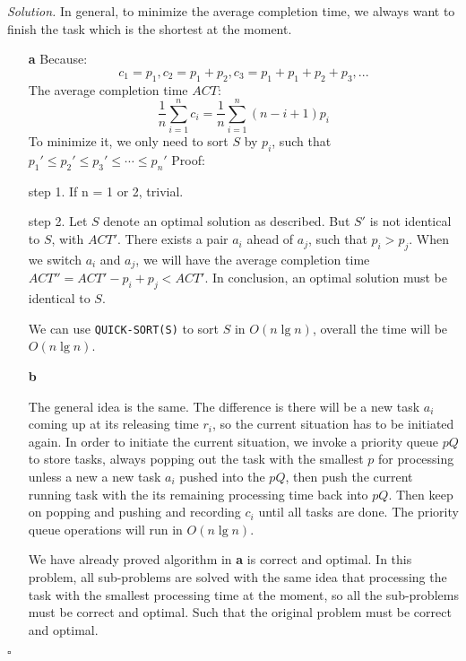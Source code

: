\documentclass[11pt]{article}
\theoremstyle{definition}
\newenvironment{solution}{\noindent\emph{Solution.}}{\hfill$\square$}
\newcommand\tab[1][1cm]{\hspace*{#1}}
\begin{document}
\begin{solution}
In general, to minimize the average completion time, we always want to finish the task which is the shortest at the moment.

\begin{enumerate}
  \item[\textbf{a}]
 Because: $$c_1 = p_1, c_2= p_1 + p_2, c_3 = p_1 + p_1 + p_2 + p_3,...$$
 The average completion time $ACT$:  $$\frac{1}{n}\sum_{i=1}^n c_i = \frac{1}{n}\sum_{i=1}^n (n-i+1)p_i$$
 To minimize it, we only need to sort $S$ by $p_i$, such that $p_1' \leq p_2' \leq p_3' \leq \cdots \leq p_n'$
Proof: 

\tab step 1. If n = 1 or 2, trivial.

\tab step 2. Let $S$ denote an optimal solution as described. But $S'$ is not identical to $S$, with $ACT'$. There exists a pair $a_i$ ahead of $a_j$, such that $p_i > p_j$. When we switch $a_i$ and $a_j$, we will have the average completion time $ACT'' = ACT' - p_i + p_j < ACT'$.
\tab In conclusion, an optimal solution must be identical to $S$.

We can use \texttt{QUICK-SORT(S)} to sort $S$ in $O(n \lg n)$, overall the time will be $O(n \lg n)$.

  \item[\textbf{b}]
  
  The general idea is the same. The difference is there will be a new task $a_i$ coming up at its releasing time $r_i$, so the current situation has to be initiated again. In order to initiate the current situation, we invoke a priority queue $pQ$ to store tasks, always popping out the task with the smallest $p$ for processing unless a new a new task $a_i$ pushed into the $pQ$, then push the current running task with the its remaining processing time back into $pQ$. Then keep on popping and pushing and recording $c_i$ until all tasks are done. The priority queue operations will run in $O(n \lg n)$. 
  
  \tab We have already proved algorithm in \textbf{a} is correct and optimal. In this problem, all sub-problems are solved with the same idea that processing the task with the smallest processing time at the moment, so all the sub-problems must be correct and optimal. Such that the original problem must be correct and optimal.
  
\end{enumerate}




\end{solution}
\end{document}
